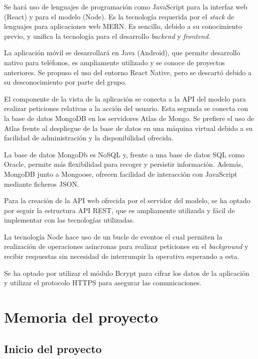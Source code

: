 \documentclass{article}
\begin{document}
Se hará uso de lenguajes de programación como JavaScript para la interfaz web (React) y para el modelo (Node). Es la tecnología requerida por el \textit{stack} de lenguajes para aplicaciones web MERN. Es sencillo, debido a su conocimiento previo, y unifica la tecnología para el desarrollo \textit{backend} y \textit{frontend}.

La aplicación móvil se desarrollará en Java (Android), que permite desarrollo nativo para teléfonos, es ampliamente utilizado y se conoce de proyectos anteriores. Se propuso el uso del entorno React Native, pero se descartó debido a su desconocimiento por parte del grupo.

El componente de la vista de la aplicación se conecta a la API del modelo para realizar peticiones relativas a la acción del usuario. Esta segunda se conecta con la base de datos MongoDB en los servidores Atlas de Mongo. Se prefiere el uso de Atlas frente al despliegue de la base de datos en una máquina virtual debido a su facilidad de administración y la disponibilidad ofrecida.

\pagebreak

La base de datos MongoDb es NoSQL y, frente a una base de datos SQL como Oracle, permite más flexibilidad para recoger y persistir información. Además, MongoDB junto a Mongoose, ofrecen facilidad de interacción con JavaScript mediante ficheros JSON.

Para la creación de la API web ofrecida por el servidor del modelo, se ha optado por seguir la estructura API REST, que es ampliamente utilizada y fácil de implementar con las tecnologías utilizadas.

La tecnología Node hace uso de un bucle de eventos el cual permiten la realización de operaciones asíncronas para realizar peticiones en el \textit{background} y recibir respuestas sin necesidad de interrumpir la operativa esperando a esta.

Se ha optado por utilizar el módulo Bcrypt para cifrar los datos de la aplicación y utilizar el protocolo HTTPS para asegurar las comunicaciones.

\pagebreak

\section{Memoria del proyecto}

\subsection{Inicio del proyecto}
\end{document}
